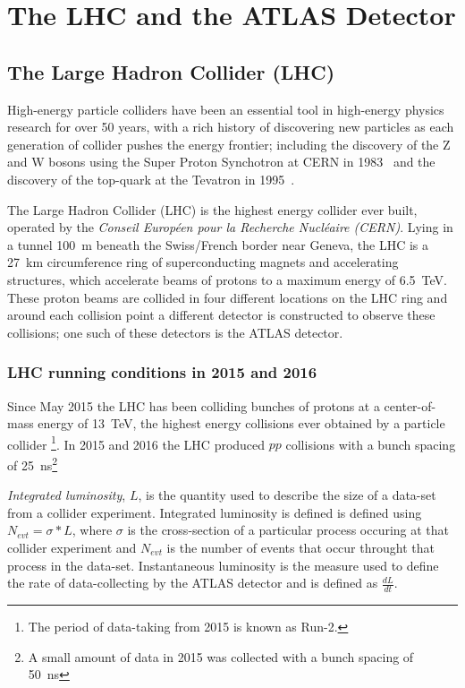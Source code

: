\chapter{The LHC and the ATLAS Detector}
\label{sec:det}

\section{The Large Hadron Collider (LHC)}
\label{sec:det-LHC}

High-energy particle colliders have been an essential tool in high-energy physics research for over 50 years,
with a rich history of discovering new particles as each generation of collider pushes the energy frontier;
including the discovery of the Z and W bosons using the Super Proton Synchotron at CERN in 1983~\cite{det-Wdisc_UA1, det-Zdisc_UA1, det-Wdisc_UA2, det-Zdisc_UA2} 
and the discovery of the  top-quark at the Tevatron in 1995~\cite{det-tdisc_CDF, det-tdisc_D0}.

The Large Hadron Collider (LHC) is the highest energy collider ever built,
operated by the \textit{Conseil Europ\'een pour la Recherche Nucl\'eaire (CERN)}.
Lying in a tunnel \SI{100}{\metre} beneath the Swiss/French border near Geneva,
the LHC is a \SI{27}{\km} circumference ring of superconducting magnets and accelerating structures,
which accelerate beams of protons to a maximum energy of \SI{6.5}{\TeV}.
These proton beams are collided in four different locations on the LHC ring
and around each collision point a different detector is constructed to observe these collisions;
one such of these detectors is the ATLAS detector.

\subsection{LHC running conditions in 2015 and 2016}

Since May 2015 the LHC has been colliding bunches of protons at a center-of-mass energy of \SI{13}{\TeV},
the highest energy collisions ever obtained by a particle collider
\footnote{The period of data-taking from 2015 is known as Run-2.}.
In 2015 and 2016 the LHC produced $pp$ collisions 
with a bunch spacing of \SI{25}{\nano\second}\footnote{A small amount of data in 2015 was collected with a bunch spacing of \SI{50}{\nano\second}}

\textit{Integrated luminosity}, $L$, is the quantity used to describe the size of a data-set from a collider experiment.
Integrated luminosity is defined is defined using $N_{evt} = \sigma * L$,
where $\sigma$ is the cross-section of a particular process occuring at that collider experiment and $N_{evt}$ is the number of events that occur throught that process in the data-set.
Instantaneous luminosity is the measure used to define the rate of data-collecting by the ATLAS detector and is defined as $\frac{dL}{dt}$.

